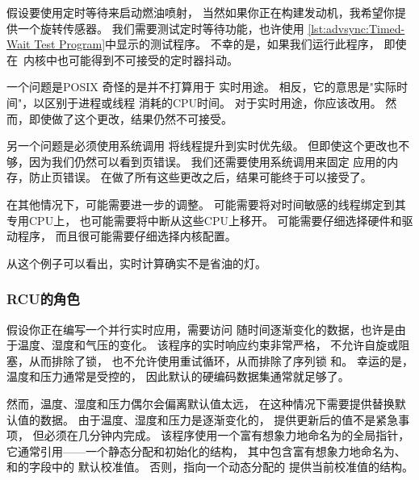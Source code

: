假设要使用定时等待来启动燃油喷射，
当然如果你正在构建发动机，我希望你提供一个旋转传感器。
我们需要测试定时等待功能，也许使用
\cref{lst:advsync:Timed-Wait Test Program}中显示的测试程序。
不幸的是，如果我们运行此程序，
即使在\rt\ 内核中也可能得到不可接受的定时器抖动。

一个问题是POSIX 奇怪的是并不打算用于
实时用途。
相反，它的意思是"实际时间"，以区别于进程或线程
消耗的CPU时间。
对于实时用途，你应该改用。
然而，即使做了这个更改，结果仍然不可接受。

另一个问题是必须使用系统调用
将线程提升到实时优先级。
但即使这个更改也不够，因为我们仍然可以看到页错误。
我们还需要使用系统调用来固定
应用的内存，防止页错误。
在做了所有这些更改之后，结果可能终于可以接受了。

在其他情况下，可能需要进一步的调整。
可能需要将对时间敏感的线程绑定到其专用CPU上，
也可能需要将中断从这些CPU上移开。
可能需要仔细选择硬件和驱动程序，
而且很可能需要仔细选择内核配置。

从这个例子可以看出，实时计算确实不是省油的灯。

\subsubsection{RCU的角色}
\label{sec:advsync:The Role of RCU}

假设你正在编写一个并行实时应用，需要访问
随时间逐渐变化的数据，也许是由于温度、湿度和气压的变化。
该程序的实时响应约束非常严格，
不允许自旋或阻塞，从而排除了锁，
也不允许使用重试循环，从而排除了序列锁
和。
幸运的是，温度和压力通常是受控的，
因此默认的硬编码数据集通常就足够了。

然而，温度、湿度和压力偶尔会偏离默认值太远，
在这种情况下需要提供替换默认值的数据。
由于温度、湿度和压力是逐渐变化的，
提供更新后的值不是紧急事项，
但必须在几分钟内完成。
该程序使用一个富有想象力地命名为的全局指针，
它通常引用——一个静态分配和初始化的结构，
其中包含富有想象力地命名为、和的字段中的
默认校准值。
否则，指向一个动态分配的
提供当前校准值的结构。

